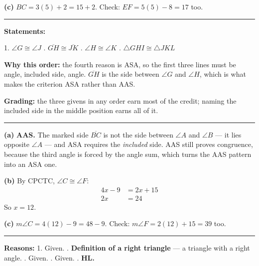 \documentclass[12pt]{article}
\begin{document}
\textbf{(c)} $BC = 3(5) + 2 = 15 + 2$. Check: $EF = 5(5) - 8 = 17$ too. 

\vspace{0.2cm}\noindent\rule{\linewidth}{0.2pt}


\textbf{Statements:}

1. $\angle G \cong \angle J$ . $\overline{GH} \cong \overline{JK}$ . $\angle H \cong \angle K$ . $\triangle GHI \cong \triangle JKL$

\textbf{Why this order:} the fourth reason is ASA, so the first three lines must be angle, included side, angle. $\overline{GH}$ is the side between $\angle G$ and $\angle H$, which is what makes the criterion ASA rather than AAS.

\textbf{Grading:} the three givens in any order earn most of the credit; naming the included side in the middle position earns all of it.

\vspace{0.2cm}\noindent\rule{\linewidth}{0.2pt}


\textbf{(a)} \textbf{AAS.} The marked side $\overline{BC}$ is not the side between $\angle A$ and $\angle B$ --- it lies opposite $\angle A$ --- and ASA requires the \emph{included} side. AAS still proves congruence, because the third angle is forced by the angle sum, which turns the AAS pattern into an ASA one.

\textbf{(b)} By CPCTC, $\angle C \cong \angle F$:
\begin{align*}
  4x - 9 &= 2x + 15 \\
  2x &= 24
\end{align*}
So $x = 12$. 

\textbf{(c)} $m\angle C = 4(12) - 9 = 48 - 9$. Check: $m\angle F = 2(12) + 15 = 39$ too. 

\vspace{0.2cm}\noindent\rule{\linewidth}{0.2pt}


\textbf{Reasons:} 1. Given. . \textbf{Definition of a right triangle} --- a triangle with a right angle. . Given. . Given. . \textbf{HL.}
\end{document}
